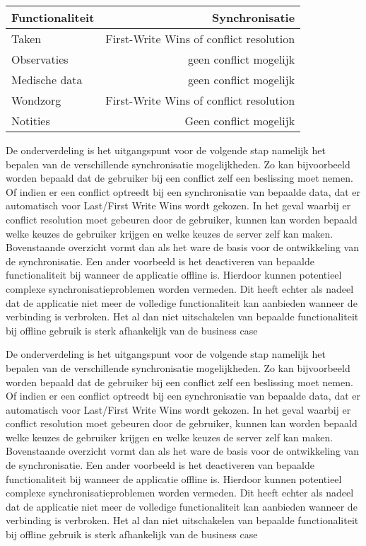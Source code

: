 \begin{center}
    \begin{tabular}{ l | r }
    \hline
    Functionaliteit & Synchronisatie \\ \hline
    Taken & First-Write Wins of conflict resolution \\
    Observaties & geen conflict mogelijk \\
    Medische data & geen conflict mogelijk \\
    Wondzorg & First-Write Wins of conflict resolution \\
    Notities & Geen conflict mogelijk \\
    \hline
    \end{tabular}
\end{center}

De onderverdeling is het uitgangspunt voor de volgende stap namelijk het bepalen van de verschillende synchronisatie mogelijkheden. Zo kan bijvoorbeeld worden bepaald dat de gebruiker bij een conflict zelf een beslissing moet nemen. Of indien er een conflict optreedt bij een synchronisatie van bepaalde data, dat er automatisch voor Last/First Write Wins wordt gekozen. In het geval waarbij er conflict resolution moet gebeuren door de gebruiker, kunnen kan worden bepaald welke keuzes de gebruiker krijgen en welke keuzes de server zelf kan maken. Bovenstaande overzicht vormt dan als het ware de basis voor de ontwikkeling van de synchronisatie. Een ander voorbeeld is het deactiveren van bepaalde functionaliteit bij wanneer de applicatie offline is. Hierdoor kunnen potentieel complexe synchronisatieproblemen worden vermeden. Dit heeft echter als nadeel dat de applicatie niet meer de volledige functionaliteit kan aanbieden wanneer de verbinding is verbroken. Het al dan niet uitschakelen van bepaalde functionaliteit bij offline gebruik is sterk afhankelijk van de business case

De onderverdeling is het uitgangspunt voor de volgende stap namelijk het bepalen van de verschillende synchronisatie mogelijkheden. Zo kan bijvoorbeeld worden bepaald dat de gebruiker bij een conflict zelf een beslissing moet nemen. Of indien er een conflict optreedt bij een synchronisatie van bepaalde data, dat er automatisch voor Last/First Write Wins wordt gekozen. In het geval waarbij er conflict resolution moet gebeuren door de gebruiker, kunnen kan worden bepaald welke keuzes de gebruiker krijgen en welke keuzes de server zelf kan maken. Bovenstaande overzicht vormt dan als het ware de basis voor de ontwikkeling van de synchronisatie. Een ander voorbeeld is het deactiveren van bepaalde functionaliteit bij wanneer de applicatie offline is. Hierdoor kunnen potentieel complexe synchronisatieproblemen worden vermeden. Dit heeft echter als nadeel dat de applicatie niet meer de volledige functionaliteit kan aanbieden wanneer de verbinding is verbroken. Het al dan niet uitschakelen van bepaalde functionaliteit bij offline gebruik is sterk afhankelijk van de business case

